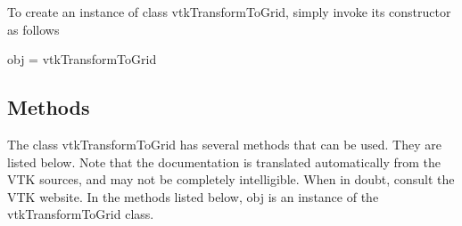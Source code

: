To create an instance of class vtk\-Transform\-To\-Grid, simply invoke its constructor as follows \begin{DoxyVerb}  obj = vtkTransformToGrid
\end{DoxyVerb}
 \hypertarget{vtkwidgets_vtkxyplotwidget_Methods}{}\subsection{Methods}\label{vtkwidgets_vtkxyplotwidget_Methods}
The class vtk\-Transform\-To\-Grid has several methods that can be used. They are listed below. Note that the documentation is translated automatically from the V\-T\-K sources, and may not be completely intelligible. When in doubt, consult the V\-T\-K website. In the methods listed below, {\ttfamily obj} is an instance of the vtk\-Transform\-To\-Grid class. 

